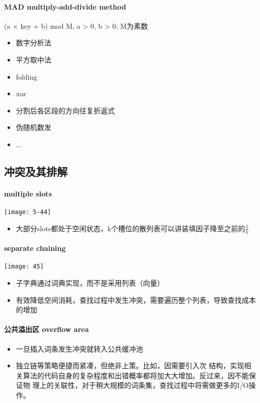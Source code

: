 \paragraph{MAD multiply-add-divide method}
(a $\times$ key + b) mod M, a > 0, b > 0, M为素数

\begin{itemize}
\item 数字分析法
\item 平方取中法
\item folding
\item xor
\item 分割后各区段的方向往复折返式
\item 伪随机数发
\item ...
\end{itemize}

\subsection{冲突及其排解}
\paragraph{multiple slots}
\texttt{[image: 5-44]}
\begin{itemize}
\item 大部分slots都处于空闲状态，k个槽位的散列表可以讲装填因子降至之前的$\frac{1}{k}$
\end{itemize}

\paragraph{separate chaining}
\texttt{[image: 45]}
\begin{itemize}
\item 子字典通过词典实现，而不是采用列表（向量）
\item 有效降低空间消耗，查找过程中发生冲突，需要遍历整个列表，导致查找成本的增加
\end{itemize}

\paragraph{公共溢出区 overflow area}
\begin{itemize}
\item 一旦插入词条发生冲突就转入公共缓冲池
\item 独立链等策略便捷而紧凑，但绝非上策。比如，因需要引入次 结构，实现相关算法的代码自身的复杂程度和出错概率都将加大大增加。反过来，因不能保证物 理上的关联性，对于稍大规模的词条集，查找过程中将需做更多的I/O操作。
\end{itemize}


